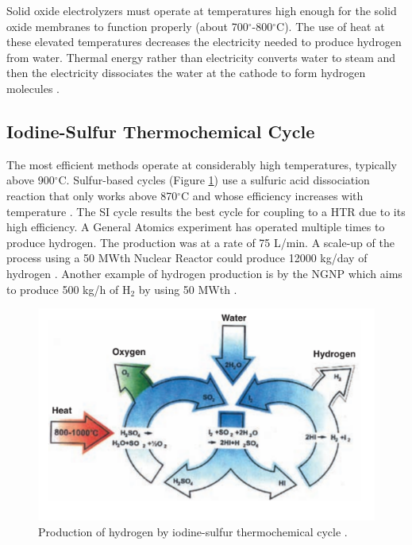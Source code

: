\documentclass{anstrans}
\begin{document}
Solid oxide electrolyzers must operate at temperatures high enough for the solid oxide membranes to function properly (about 700$^{\circ}$-800$^{\circ}$C). The use of heat at these elevated temperatures decreases the electricity needed to produce hydrogen from water.
Thermal energy rather than electricity converts water to steam and then the electricity dissociates the water at the cathode to form hydrogen molecules \cite{xu_introduction_2017}.

\subsection{Iodine-Sulfur Thermochemical Cycle}

The most efficient methods operate at considerably high temperatures, typically above 900$^{\circ}$C. Sulfur-based cycles (Figure \ref{fig:isulfur}) use a sulfuric acid dissociation reaction that only works above 870$^{\circ}$C and whose efficiency increases with temperature \cite{cea_gas-cooled_2006}.
The \gls{SI} cycle results the best cycle for coupling to a \gls{HTR} due to its high efficiency. A General Atomics experiment has operated multiple times to produce hydrogen.
The production was at a rate of 75 L/min. A scale-up of the process using a 50 MWth Nuclear Reactor could produce 12000 kg/day of hydrogen \cite{benjamin_russ_sulfur_2009}.
Another example of hydrogen production is by the \gls{NGNP} \cite{macdonald_ngnp_2003} which aims to produce 500 kg/h of H$_2$ by using 50 MWth \cite{cea_gas-cooled_2006}.

\begin{figure}[]
	\centering
	\includegraphics[width=0.9\linewidth]{figures/iodine-sulfur.png}
	\hfill
	\caption{Production of hydrogen by iodine-sulfur thermochemical cycle \cite{cea_gas-cooled_2006}.}
	\label{fig:isulfur}
\end{figure}
\end{document}
